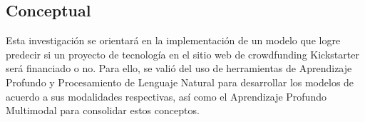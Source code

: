 \subsection{Conceptual}
Esta investigación se orientará en la implementación de un modelo que logre predecir si un proyecto de tecnología en el sitio web de crowdfunding Kickstarter será financiado o no. Para ello, se valió del uso de herramientas de Aprendizaje Profundo y Procesamiento de Lenguaje Natural para desarrollar los modelos de acuerdo a sus modalidades respectivas, así como el Aprendizaje Profundo Multimodal para consolidar estos conceptos.